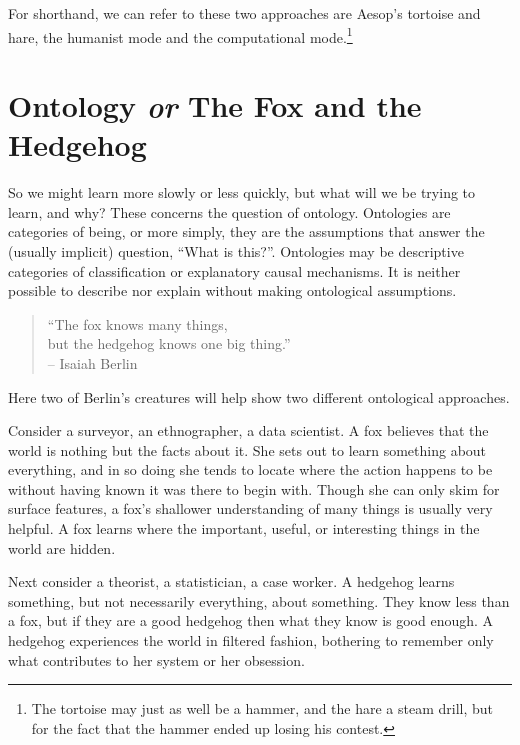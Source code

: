 \documentclass[]{book}
\let\rmarkdownfootnote\footnote%
\def\footnote{\protect\rmarkdownfootnote}
\begin{document}
For shorthand, we can refer to these two approaches are Aesop's tortoise
and hare, the humanist mode and the computational mode.\footnote{The
  tortoise may just as well be a hammer, and the hare a steam drill, but
  for the fact that the hammer ended up losing his contest.}

\section{\texorpdfstring{Ontology \emph{or} The Fox and the
Hedgehog}{Ontology or The Fox and the Hedgehog}}\label{ontology-or-the-fox-and-the-hedgehog}

So we might learn more slowly or less quickly, but what will we be
trying to learn, and why? These concerns the question of ontology.
Ontologies are categories of being, or more simply, they are the
assumptions that answer the (usually implicit) question, ``What is
this?''. Ontologies may be descriptive categories of classification or
explanatory causal mechanisms. It is neither possible to describe nor
explain without making ontological assumptions.

\begin{quote}
``The fox knows many things,\\
but the hedgehog knows one big thing.''\\
-- Isaiah Berlin\citeyearpar[1]{Berlin1953Hedgehog}
\end{quote}

Here two of Berlin's creatures will help show two different ontological
approaches.

Consider a surveyor, an ethnographer, a data scientist. A fox believes
that the world is nothing but the facts about it. She sets out to learn
something about everything, and in so doing she tends to locate where
the action happens to be without having known it was there to begin
with. Though she can only skim for surface features, a fox's shallower
understanding of many things is usually very helpful. A fox learns where
the important, useful, or interesting things in the world are hidden.

Next consider a theorist, a statistician, a case worker. A hedgehog
learns something, but not necessarily everything, about something. They
know less than a fox, but if they are a good hedgehog then what they
know is good enough. A hedgehog experiences the world in filtered
fashion, bothering to remember only what contributes to her system or
her obsession.
\end{document}
